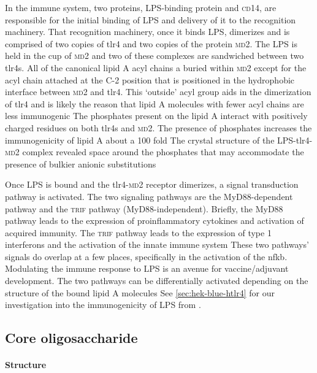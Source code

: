 In the immune system, two proteins, \ac{LPS}-binding protein and \textsc{cd}14,
are responsible for the initial binding of  \ac{LPS} and delivery of it to the recognition machinery.
That recognition machinery, once it binds \ac{LPS}, dimerizes and is comprised
of two copies of \ac{tlr4} and two copies of the protein \textsc{md}2. The \ac{LPS} is held in the cup of
\textsc{md}2 and two of these complexes are sandwiched between two \acp{tlr4}. All of the canonical lipid A acyl chains a buried within \textsc{md}2 except for the acyl chain attached
at the C-2 position that is positioned in the hydrophobic interface between \textsc{md}2 and \ac{tlr4}. This `outside' acyl group aids in the dimerization of \ac{tlr4} and is likely
the reason that lipid A molecules with fewer acyl chains are less immunogenic The phosphates present on the lipid A interact with positively
charged residues on both \acp{tlr4} and \textsc{md}2. The presence of phosphates increases the immunogenicity of lipid A about a 100 fold The
crystal structure of the \ac{LPS}-\ac{tlr4}-\textsc{md}2 complex revealed space around the phosphates that may accommodate the presence of bulkier anionic
substitutions

Once \ac{LPS} is bound and the \ac{tlr4}-\textsc{md}2 receptor dimerizes, a signal transduction pathway is activated. The two signaling pathways are the
MyD88-dependent pathway and the \textsc{trif} pathway (MyD88-independent).
Briefly, the MyD88 pathway leads to the expression of proinflammatory cytokines
and activation of acquired immunity. The \textsc{trif}
pathway leads to the expression of type 1 interferons and the activation of the innate immune system These two pathways' signals do overlap at a few places,
specifically in the activation of the \ac{nfkb}. Modulating the immune response to \ac{LPS} is an avenue for vaccine/adjuvant development. The two pathways can be differentially
activated depending on the structure of the bound lipid A molecules See \cref{sec:hek-blue-htlr4} for our investigation into the immunogenicity of
\ac{LPS} from \caulobacter.

  \subsection{Core oligosaccharide}\label{sec:core-oligosaccharide-intro}
  
    \paragraph{Structure}

